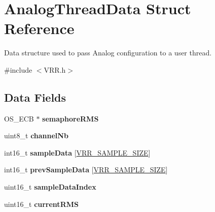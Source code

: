 \hypertarget{struct_analog_thread_data}{}\section{Analog\+Thread\+Data Struct Reference}
\label{struct_analog_thread_data}


Data structure used to pass Analog configuration to a user thread.  




{\ttfamily \#include $<$V\+R\+R.\+h$>$}

\subsection*{Data Fields}
\begin{DoxyCompactItemize}
\item 
\hypertarget{struct_analog_thread_data_adb1274c00925e05895786fcab8990834}{}O\+S\+\_\+\+E\+C\+B $\ast$ {\bfseries semaphore\+R\+M\+S}\label{struct_analog_thread_data_adb1274c00925e05895786fcab8990834}

\item 
\hypertarget{struct_analog_thread_data_a896bcccdd678ec542be06dcb6cc91031}{}uint8\+\_\+t {\bfseries channel\+Nb}\label{struct_analog_thread_data_a896bcccdd678ec542be06dcb6cc91031}

\item 
\hypertarget{struct_analog_thread_data_a27c4b49c9237b04d653cb9ac139ecb40}{}int16\+\_\+t {\bfseries sample\+Data} \mbox{[}\hyperlink{_v_r_r_8h_a217a973f4d9c03d02faa87abec73b213}{V\+R\+R\+\_\+\+S\+A\+M\+P\+L\+E\+\_\+\+S\+I\+Z\+E}\mbox{]}\label{struct_analog_thread_data_a27c4b49c9237b04d653cb9ac139ecb40}

\item 
\hypertarget{struct_analog_thread_data_a03d19dda6515e3bae6ce0fc725127ff1}{}int16\+\_\+t {\bfseries prev\+Sample\+Data} \mbox{[}\hyperlink{_v_r_r_8h_a217a973f4d9c03d02faa87abec73b213}{V\+R\+R\+\_\+\+S\+A\+M\+P\+L\+E\+\_\+\+S\+I\+Z\+E}\mbox{]}\label{struct_analog_thread_data_a03d19dda6515e3bae6ce0fc725127ff1}

\item 
\hypertarget{struct_analog_thread_data_aa22eeefd82b49779658151a1ac8a63ce}{}uint16\+\_\+t {\bfseries sample\+Data\+Index}\label{struct_analog_thread_data_aa22eeefd82b49779658151a1ac8a63ce}

\item 
\hypertarget{struct_analog_thread_data_af8abf131ca4e6ab3b135f728b265dcbb}{}uint16\+\_\+t {\bfseries current\+R\+M\+S}\label{struct_analog_thread_data_af8abf131ca4e6ab3b135f728b265dcbb}

\end{DoxyCompactItemize}


